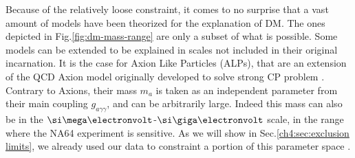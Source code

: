 Because of the relatively loose constraint, it comes to no surprise that a vast amount of models have been theorized for the explanation of DM. The ones depicted in Fig.\ref{fig:dm-mass-range} are only a subset of what is possible. Some models can be extended to be explained in scales not included in their original incarnation. It is the case for Axion Like Particles (ALPs), that are an extension of the QCD Axion model originally developed to solve strong CP problem \cite{PhysRevD.16.1791}. Contrary to Axions, their mass $m_a$ is taken as an independent parameter from their main coupling $g_{a \gamma \gamma}$, and can be arbitrarily large. Indeed this mass can also be in the $\mev$-$\gev$ scale, in the range where the NA64 experiment is sensitive. As we will show in Sec.\ref{ch4:sec:exclusion limits}, we already used our data to constraint a portion of this parameter space \cite{Banerjee:2020fue}.

